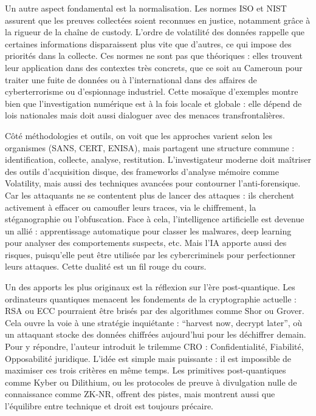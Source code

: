 \documentclass[12pt,a4paper]{report}
\begin{document}
	
	Un autre aspect fondamental est la normalisation. Les normes ISO et NIST assurent que les preuves collectées soient reconnues en justice, notamment grâce à la rigueur de la chaîne de custody. L’ordre de volatilité des données rappelle que certaines informations disparaissent plus vite que d’autres, ce qui impose des priorités dans la collecte. Ces normes ne sont pas que théoriques : elles trouvent leur application dans des contextes très concrets, que ce soit au Cameroun pour traiter une fuite de données ou à l’international dans des affaires de cyberterrorisme ou d’espionnage industriel. Cette mosaïque d’exemples montre bien que l’investigation numérique est à la fois locale et globale : elle dépend de lois nationales mais doit aussi dialoguer avec des menaces transfrontalières.
	
	
	Côté méthodologies et outils, on voit que les approches varient selon les organismes (SANS, CERT, ENISA), mais partagent une structure commune : identification, collecte, analyse, restitution. L’investigateur moderne doit maîtriser des outils d’acquisition disque, des frameworks d’analyse mémoire comme Volatility, mais aussi des techniques avancées pour contourner l’anti-forensique. Car les attaquants ne se contentent plus de lancer des attaques : ils cherchent activement à effacer ou camoufler leurs traces, via le chiffrement, la stéganographie ou l’obfuscation. Face à cela, l’intelligence artificielle est devenue un allié : apprentissage automatique pour classer les malwares, deep learning pour analyser des comportements suspects, etc. Mais l’IA apporte aussi des risques, puisqu’elle peut être utilisée par les cybercriminels pour perfectionner leurs attaques. Cette dualité est un fil rouge du cours.
	
	
	Un des apports les plus originaux est la réflexion sur l’ère post-quantique. Les ordinateurs quantiques menacent les fondements de la cryptographie actuelle : RSA ou ECC pourraient être brisés par des algorithmes comme Shor ou Grover. Cela ouvre la voie à une stratégie inquiétante : “harvest now, decrypt later”, où un attaquant stocke des données chiffrées aujourd’hui pour les déchiffrer demain. Pour y répondre, l’auteur introduit le trilemme CRO : Confidentialité, Fiabilité, Opposabilité juridique. L’idée est simple mais puissante : il est impossible de maximiser ces trois critères en même temps. Les primitives post-quantiques comme Kyber ou Dilithium, ou les protocoles de preuve à divulgation nulle de connaissance comme ZK-NR, offrent des pistes, mais montrent aussi que l’équilibre entre technique et droit est toujours précaire.
	
\end{document}
